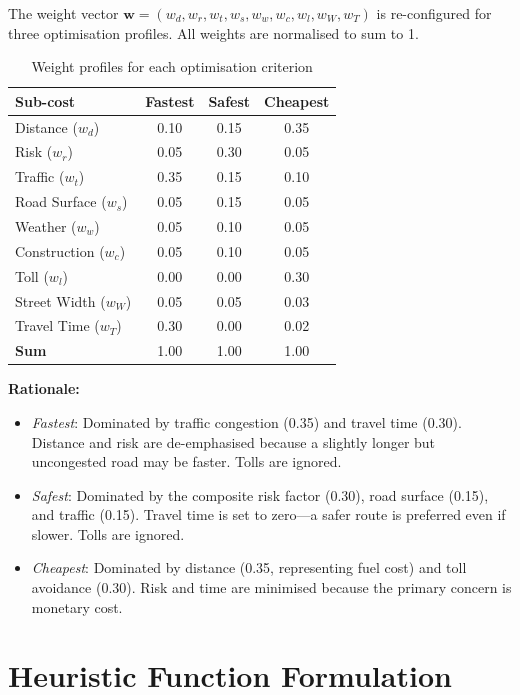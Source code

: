 ﻿\documentclass[a4paper, 12pt]{article}
\theoremstyle{remark}
\begin{document}
The weight vector $\mathbf{w} = (w_d, w_r, w_t, w_s, w_w, w_c, w_l, w_W, w_T)$ is re-configured for three optimisation profiles. All weights are normalised to sum to 1.

\begin{table}[h!]
\centering
\caption{Weight profiles for each optimisation criterion}
\label{tab:weights}
\begin{tabular}{lccc}
\toprule
\textbf{Sub-cost} & \textbf{Fastest} & \textbf{Safest} & \textbf{Cheapest} \\
\midrule
Distance ($w_d$)         & 0.10 & 0.15 & 0.35 \\
Risk ($w_r$)             & 0.05 & 0.30 & 0.05 \\
Traffic ($w_t$)          & 0.35 & 0.15 & 0.10 \\
Road Surface ($w_s$)     & 0.05 & 0.15 & 0.05 \\
Weather ($w_w$)          & 0.05 & 0.10 & 0.05 \\
Construction ($w_c$)     & 0.05 & 0.10 & 0.05 \\
Toll ($w_l$)             & 0.00 & 0.00 & 0.30 \\
Street Width ($w_W$)     & 0.05 & 0.05 & 0.03 \\
Travel Time ($w_T$)      & 0.30 & 0.00 & 0.02 \\
\midrule
\textbf{Sum}             & 1.00 & 1.00 & 1.00 \\
\bottomrule
\end{tabular}
\end{table}

\textbf{Rationale:}
\begin{itemize}
    \item \emph{Fastest}: Dominated by traffic congestion (0.35) and travel time (0.30). Distance and risk are de-emphasised because a slightly longer but uncongested road may be faster. Tolls are ignored.
    \item \emph{Safest}: Dominated by the composite risk factor (0.30), road surface (0.15), and traffic (0.15). Travel time is set to zero---a safer route is preferred even if slower. Tolls are ignored.
    \item \emph{Cheapest}: Dominated by distance (0.35, representing fuel cost) and toll avoidance (0.30). Risk and time are minimised because the primary concern is monetary cost.
\end{itemize}

\section{Heuristic Function Formulation}
\label{sec:heuristic}
\end{document}
